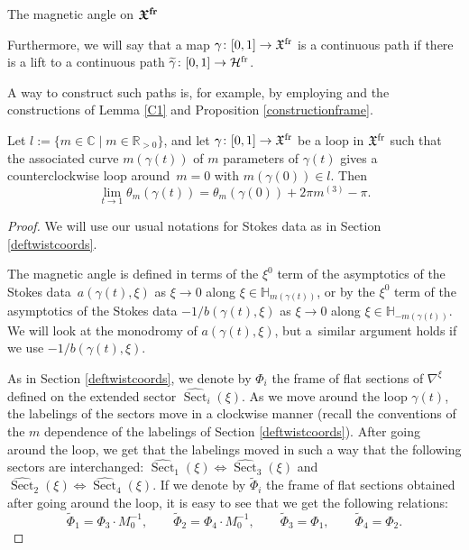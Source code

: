 \begin{subsubsection}{The magnetic angle on $\boldsymbol{\mathfrak{X}^{{\rm fr}}}$}
\begin{Definition}
Furthermore, we will say that a map $\gamma\colon [0,1]\to \mathfrak{X}^{\textnormal{fr}}$ is a continuous path if there is a lift to a continuous path $\widetilde{\gamma}\colon [0,1]\to \mathcal{H}^{\textnormal{fr}}$.
\end{Definition}
\begin{Remark} A way to construct such paths is, for example, by employing \cite[Proposition~4.9]{M5} and the constructions of Lemma \ref{C1} and Proposition \ref{constructionframe}.
\end{Remark}
\begin{Proposition} \label{magmon} Let $l:=\{ m\in \mathbb{C} \mid m\in \mathbb{R}_{>0}\}$, and let $\gamma\colon [0,1]\to \mathfrak{X}^{\textnormal{fr}}$ be a loop in $\mathfrak{X}^{\textnormal{fr}}$ such that the associated curve $m(\gamma(t))$ of $m$ parameters of $\gamma(t)$ gives a counterclockwise loop around~${m=0}$ with $m(\gamma(0)) \in l$. Then
\begin{equation*}
 \lim_{t\to 1}\theta_m(\gamma(t))=\theta_m(\gamma(0)) +2\pi m^{(3)}-\pi.
\end{equation*}
\end{Proposition}

\begin{proof}
We will use our usual notations for Stokes data as in Section \ref{deftwistcoords}.

The magnetic angle is defined in terms of the $\xi^0$ term of the asymptotics of the Stokes data~${a(\gamma(t),\xi)}$ as $\xi \to 0$ along $\xi \in \mathbb{H}_{m(\gamma(t))}$, or by the $\xi^{0}$ term of the asymptotics of the Stokes data $-1/b(\gamma(t),\xi)$ as $\xi \to 0$ along $\xi \in \mathbb{H}_{-m(\gamma(t))}$. We will look at the monodromy of $a(\gamma(t),\xi)$, but a~similar argument holds if we use $-1/b(\gamma(t),\xi)$.

As in Section \ref{deftwistcoords}, we denote by $\Phi_i$ the frame of flat sections of $\nabla^{\xi}$ defined on the extended sector $\widehat{\operatorname{Sect}}_i(\xi)$. As we move around the loop $\gamma(t)$, the labelings of the sectors move in a clockwise manner (recall the conventions of the $m$ dependence of the labelings of Section \ref{deftwistcoords}). After going around the loop, we get that the labelings moved in such a way that the following sectors are interchanged: $\widehat{\operatorname{Sect}}_1(\xi) \iff \widehat{\operatorname{Sect}}_3(\xi)$ and $\widehat{\operatorname{Sect}}_2(\xi) \iff \widehat{\operatorname{Sect}}_4(\xi)$. If we denote by $\widetilde{\Phi}_i$ the frame of flat sections obtained after going around the loop, it is easy to see that we get the following relations:
\begin{equation}\label{mmonodromy}
 \widetilde{\Phi}_1 = \Phi_3 \cdot M_0^{-1},\qquad
 \widetilde{\Phi}_2= \Phi_4 \cdot M_0^{-1},\qquad
 \widetilde{\Phi}_3= \Phi_1,\qquad
 \widetilde{\Phi}_4 = \Phi_2.
\end{equation}


\end{proof}
\end{subsubsection}
